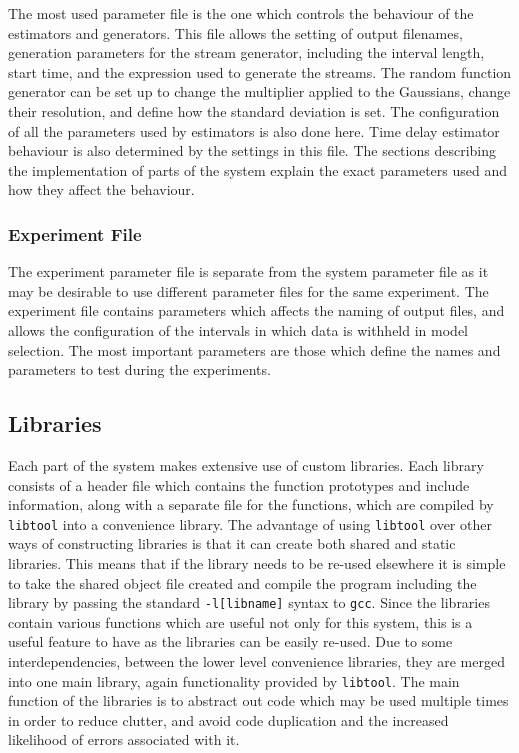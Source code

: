 \documentclass[a4paper,11pt]{article}
\begin{document}
    The most used parameter file is the one which controls the behaviour of the
    estimators and generators. This file allows the setting of output filenames,
    generation parameters for the stream generator, including the interval length,
    start time, and the expression used to generate the streams. The random function
    generator can be set up to change the multiplier applied to the Gaussians,
    change their resolution, and define how the standard deviation is set. The
    configuration of all the parameters used by estimators is also done here. Time
    delay estimator behaviour is also determined by the settings in this
    file. The sections describing the implementation of parts of the system explain
    the exact parameters used and how they affect the behaviour.
\subsubsection{Experiment File}
\label{sec-3-2-2}

    The experiment parameter file is separate from the system parameter file as it
    may be desirable to use different parameter files for the same experiment. The
    experiment file contains parameters which affects the naming of output files,
    and allows the configuration of the intervals in which data is withheld in model
    selection. The most important parameters are those which define the names and
    parameters to test during the experiments.
\subsection{Libraries}
\label{sec-3-3}

   Each part of the system makes extensive use of custom libraries. Each library
   consists of a header file which contains the function prototypes and include
   information, along with a separate file for the functions, which are compiled by
   \texttt{libtool} into a convenience library. The advantage of using
   \texttt{libtool} over other ways of constructing libraries is that it can create
   both shared and static libraries. This means that if the library needs to be
   re-used elsewhere it is simple to take the shared object file created and
   compile the program including the library by passing the standard
   \texttt{-l[libname]} syntax to \texttt{gcc}. Since the libraries contain various
   functions which are useful not only for this system, this is a useful feature to
   have as the libraries can be easily re-used. Due to some interdependencies,
   between the lower level convenience libraries, they are merged into one main
   library, again functionality provided by \texttt{libtool}. The main function of
   the libraries is to abstract out code which may be used multiple times in order
   to reduce clutter, and avoid code duplication and the increased likelihood of
   errors associated with it. 
\end{document}
